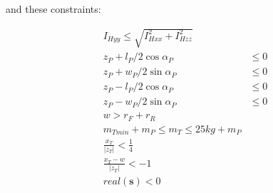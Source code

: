 \documentclass{article}
\begin{document}
and these constraints:

\begin{align}
  I_{Hyy} \leq \sqrt{I_{Hxx}^2 + I_{Hzz}^2} \\
  z_P + l_P / 2 \cos{\alpha_P} & \leq 0 \\
  z_P + w_P / 2 \sin{\alpha_P} & \leq 0 \\
  z_P - l_P / 2 \cos{\alpha_P} & \leq 0 \\
  z_P - w_P / 2 \sin{\alpha_P} & \leq 0 \\
  w > r_F + r_R \\
  m_{Tmin} + m_P \leq m_T \leq 25 \si{kg} + m_P \\
  \frac{x_T}{|z_T|} < \frac{1}{4} \\
  \frac{x_T - w}{|z_T|} < -1 \\
  real(\mathbf{s}) < 0
\end{align}
\end{document}
